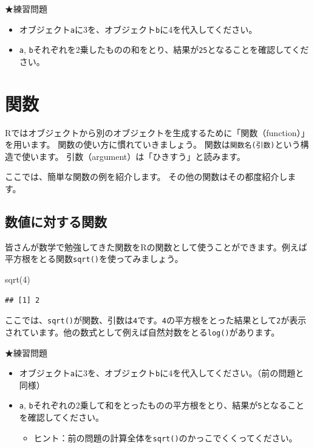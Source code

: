 \documentclass[
]{book}
\newenvironment{Shaded}{\begin{snugshade}}{\end{snugshade}}
\newcommand{\DecValTok}[1]{\textcolor[rgb]{0.00,0.00,0.81}{#1}}
\newcommand{\FunctionTok}[1]{\textcolor[rgb]{0.00,0.00,0.00}{#1}}
\newcommand{\NormalTok}[1]{#1}
\providecommand{\tightlist}{%
  \setlength{\itemsep}{0pt}\setlength{\parskip}{0pt}}
\begin{document}
★練習問題

\begin{itemize}
\tightlist
\item
  オブジェクト\texttt{a}に3を、オブジェクト\texttt{b}に4を代入してください。
\item
  \texttt{a}, \texttt{b}それぞれを2乗したものの和をとり、結果が\texttt{25}となることを確認してください。
\end{itemize}

\hypertarget{ux95a2ux6570}{%
\section{関数}\label{ux95a2ux6570}}

Rではオブジェクトから別のオブジェクトを生成するために「関数（function）」を用います。
関数の使い方に慣れていきましょう。
関数は\texttt{関数名(引数)}という構造で使います。
引数（argument）は「ひきすう」と読みます。

ここでは、簡単な関数の例を紹介します。
その他の関数はその都度紹介します。

\hypertarget{ux6570ux5024ux306bux5bfeux3059ux308bux95a2ux6570}{%
\subsection{数値に対する関数}\label{ux6570ux5024ux306bux5bfeux3059ux308bux95a2ux6570}}

皆さんが数学で勉強してきた関数をRの関数として使うことができます。例えば平方根をとる関数\texttt{sqrt()}を使ってみましょう。

\begin{Shaded}
\begin{Highlighting}[]
\FunctionTok{sqrt}\NormalTok{(}\DecValTok{4}\NormalTok{)}
\end{Highlighting}
\end{Shaded}

\begin{verbatim}
## [1] 2
\end{verbatim}

ここでは、\texttt{sqrt()}が関数、引数は\texttt{4}です。\texttt{4}の平方根をとった結果として\texttt{2}が表示されています。他の数式として例えば自然対数をとる\texttt{log()}があります。

★練習問題

\begin{itemize}
\tightlist
\item
  オブジェクト\texttt{a}に3を、オブジェクト\texttt{b}に4を代入してください。（前の問題と同様）
\item
  \texttt{a}, \texttt{b}それぞれの2乗して和をとったものの平方根をとり、結果が\texttt{5}となることを確認してください。

  \begin{itemize}
  \tightlist
  \item
    ヒント：前の問題の計算全体を\texttt{sqrt()}のかっこでくくってください。
  \end{itemize}
\end{itemize}
\end{document}

